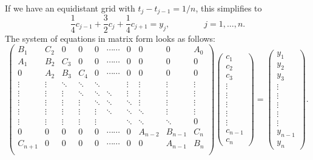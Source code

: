 \begin{problem}
\begin{subproblem}[3]
\begin{solution}
\begin{equation}
\end{equation}
If we have an equidistant grid with $t_j - t_{j-1} = 1/n$, this simplifies to
\begin{equation*}%
 \frac{1}{4}c_{j-1} + \frac{3}{2} c_j + \frac{1}{4} c_{j+1} = y_j,\qquad \qquad j=1,\ldots,n.
\end{equation*}
The system of equations in matrix form looks as follows:
\begin{equation}\label{system}
 \begin{pmatrix}
  B_1 & C_2 & 0 & 0 & 0 & \cdots \cdots & 0 & 0 & 0 & A_0\\
  A_1 & B_2 & C_3 & 0 & 0 & \cdots \cdots & 0 & 0 & 0 & 0 \\
  0 & A_2 & B_3 & C_4 & 0 & \cdots \cdots & 0 & 0 & 0 & 0 \\
  \vdots & \vdots & \ddots & \ddots & \ddots &  & \vdots & \vdots & \vdots & \vdots \\
  \vdots & \vdots & \vdots & \ddots & \ddots & \ddots & \vdots & \vdots & \vdots & \vdots \\
  \vdots & \vdots & \vdots & \vdots & \ddots & \ddots & \ddots & \vdots & \vdots & \vdots \\
  \vdots & \vdots & \vdots & \vdots & \vdots& \ddots & \ddots & \ddots & \vdots & \vdots \\
  \vdots & \vdots & \vdots & \vdots & \vdots & & \ddots & \ddots & \ddots & 0 \\
  0 & 0 & 0 & 0 & 0 & \cdots \cdots & 0 & A_{n-2} & B_{n-1} & C_n \\
  C_{n+1} & 0 & 0 & 0 & 0 & \cdots \cdots & 0 & 0 & A_{n-1} & B_n \\
 \end{pmatrix}
 \begin{pmatrix}c_1\\c_2\\c_3\\\vdots\\\vdots\\\vdots\\\vdots\\\vdots\\c_{n-1}\\c_n\end{pmatrix}
=\begin{pmatrix}y_1\\y_2\\y_3\\\vdots\\\vdots\\\vdots\\\vdots\\\vdots\\y_{n-1}\\y_n\end{pmatrix}.
\end{equation}
\end{solution}
\end{subproblem}


\end{problem}
